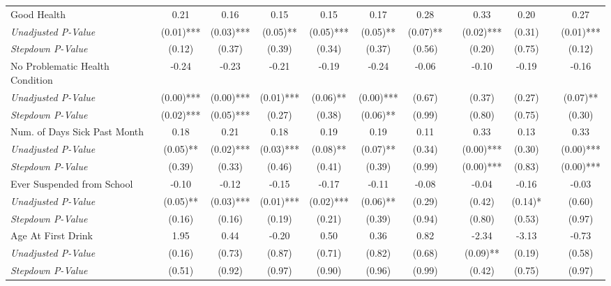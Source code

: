 \begin{tabular}{l c c c c c c c c c c c}
Good Health & 0.21 & 0.16 & 0.15 & 0.15 & 0.17 & 0.28 & & 0.33 & 0.20 & & 0.27 \\
\quad \textit{Unadjusted P-Value} & (0.01)*** & (0.03)*** & (0.05)** & (0.05)*** & (0.05)** & (0.07)** & & (0.02)*** & (0.31) & & (0.01)*** \\
\quad \textit{Stepdown P-Value} & (0.12) & (0.37) & (0.39) & (0.34) & (0.37) & (0.56) & & (0.20) & (0.75) & & (0.12) \\
No Problematic Health Condition & -0.24 & -0.23 & -0.21 & -0.19 & -0.24 & -0.06 & & -0.10 & -0.19 & & -0.16 \\
\quad \textit{Unadjusted P-Value} & (0.00)*** & (0.00)*** & (0.01)*** & (0.06)** & (0.00)*** & (0.67) & & (0.37) & (0.27) & & (0.07)** \\
\quad \textit{Stepdown P-Value} & (0.02)*** & (0.05)*** & (0.27) & (0.38) & (0.06)** & (0.99) & & (0.80) & (0.75) & & (0.30) \\
Num. of Days Sick Past Month & 0.18 & 0.21 & 0.18 & 0.19 & 0.19 & 0.11 & & 0.33 & 0.13 & & 0.33 \\
\quad \textit{Unadjusted P-Value} & (0.05)** & (0.02)*** & (0.03)*** & (0.08)** & (0.07)** & (0.34) & & (0.00)*** & (0.30) & & (0.00)*** \\
\quad \textit{Stepdown P-Value} & (0.39) & (0.33) & (0.46) & (0.41) & (0.39) & (0.99) & & (0.00)*** & (0.83) & & (0.00)*** \\
Ever Suspended from School & -0.10 & -0.12 & -0.15 & -0.17 & -0.11 & -0.08 & & -0.04 & -0.16 & & -0.03 \\
\quad \textit{Unadjusted P-Value} & (0.05)** & (0.03)*** & (0.01)*** & (0.02)*** & (0.06)** & (0.29) & & (0.42) & (0.14)* & & (0.60) \\
\quad \textit{Stepdown P-Value} & (0.16) & (0.16) & (0.19) & (0.21) & (0.39) & (0.94) & & (0.80) & (0.53) & & (0.97) \\
Age At First Drink & 1.95 & 0.44 & -0.20 & 0.50 & 0.36 & 0.82 & & -2.34 & -3.13 & & -0.73 \\
\quad \textit{Unadjusted P-Value} & (0.16) & (0.73) & (0.87) & (0.71) & (0.82) & (0.68) & & (0.09)** & (0.19) & & (0.58) \\
\quad \textit{Stepdown P-Value} & (0.51) & (0.92) & (0.97) & (0.90) & (0.96) & (0.99) & & (0.42) & (0.75) & & (0.97) \\
\bottomrule
\end{tabular}
